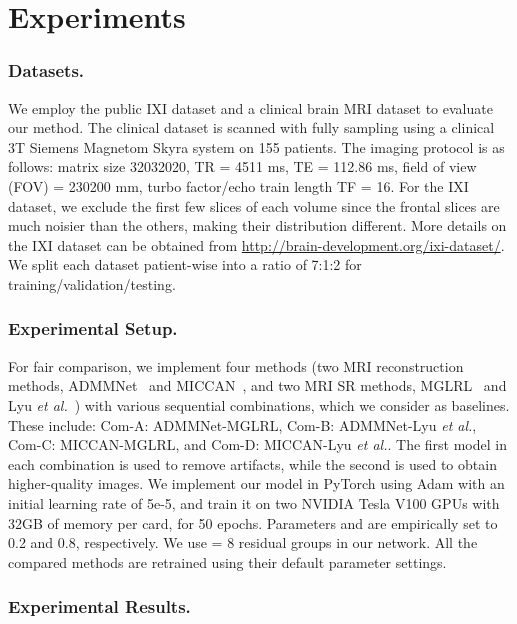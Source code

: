 \documentclass[runningheads]{llncs}
\begin{document}
\section{Experiments}
\subsubsection{Datasets.}
We employ the public IXI dataset and a clinical brain MRI dataset to evaluate our method. The clinical dataset is scanned with fully sampling using a clinical 3T Siemens Magnetom Skyra system on 155 patients. The imaging protocol is as follows: matrix size 32032020, TR = 4511 ms, TE = 112.86 ms, field of view (FOV) = 230200 mm, turbo factor/echo train length TF = 16. For the IXI dataset, we exclude the first few slices of each volume since the frontal slices are much noisier than the others, making their distribution different. More details on the IXI dataset can be obtained from \url{http://brain-development.org/ixi-dataset/}. We split each dataset patient-wise into a ratio of 7:1:2 for training/validation/testing.


\subsubsection{Experimental Setup.}For fair comparison, we implement four methods (two MRI reconstruction methods, ADMMNet~\cite{yang2016deep} and MICCAN~\cite{huang2019mri}, and two MRI SR methods, MGLRL~\cite{shi2018super} and Lyu \textit{et al.}~\cite{lyu2020mri}) with various sequential combinations, which we consider as baselines. These include: Com-A: ADMMNet-MGLRL, Com-B: ADMMNet-Lyu \textit{et al.}, Com-C: MICCAN-MGLRL, and Com-D: MICCAN-Lyu \textit{et al.}. The first model in each combination is used to remove artifacts, while the second is used to obtain higher-quality images. We implement our model in PyTorch using Adam with an initial learning rate of 5e-5, and train it on two NVIDIA Tesla V100 GPUs with 32GB of memory per card, for 50 epochs. Parameters  and  are empirically set to 0.2 and 0.8, respectively. We use  = 8 residual groups in our network. All the compared methods are retrained using their default parameter settings. 

\subsubsection{Experimental Results.}
\end{document}
